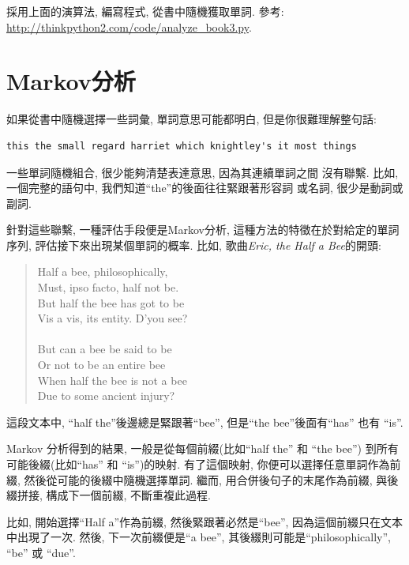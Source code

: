 \documentclass[10pt]{book}
\begin{document}
\begin{exercise}
\label{randhist}

採用上面的演算法, 編寫程式, 從書中隨機獲取單詞. 參考:
\url{http://thinkpython2.com/code/analyze_book3.py}.

\end{exercise}



\section{Markov分析}
\label{markov}
如果從書中隨機選擇一些詞彙, 單詞意思可能都明白, 
但是你很難理解整句話:

\begin{verbatim}
this the small regard harriet which knightley's it most things
\end{verbatim}
%
一些單詞隨機組合, 很少能夠清楚表達意思, 因為其連續單詞之間
沒有聯繫. 比如, 一個完整的語句中, 我們知道``the''的後面往往緊跟著形容詞
或名詞, 很少是動詞或副詞. 

針對這些聯繫, 一種評估手段便是Markov分析, 這種方法的特徵在於對給定的單詞序列, 
評估接下來出現某個單詞的概率. 比如, 歌曲{\em Eric, the Half a Bee}的開頭:

\begin{quote}
Half a bee, philosophically, \\
Must, ipso facto, half not be. \\
But half the bee has got to be \\
Vis a vis, its entity. D'you see? \\
\\
But can a bee be said to be \\
Or not to be an entire bee \\
When half the bee is not a bee \\
Due to some ancient injury? \\
\end{quote}
%
這段文本中, ``half the''後邊總是緊跟著``bee'',
但是``the bee''後面有``has'' 也有 ``is''.

Markov 分析得到的結果, 一般是從每個前綴(比如``half the'' 和 ``the bee'')
到所有可能後綴(比如``has'' 和 ``is'')的映射.
有了這個映射, 你便可以選擇任意單詞作為前綴, 
然後從可能的後綴中隨機選擇單詞. 繼而, 用合併後句子的末尾作為前綴, 與後綴拼接, 
構成下一個前綴, 不斷重複此過程. 

比如, 開始選擇``Half a''作為前綴, 然後緊跟著必然是``bee'', 
因為這個前綴只在文本中出現了一次. 然後, 下一次前綴便是``a bee'', 
其後綴則可能是``philosophically'', ``be'' 或 ``due''.
\end{document}
